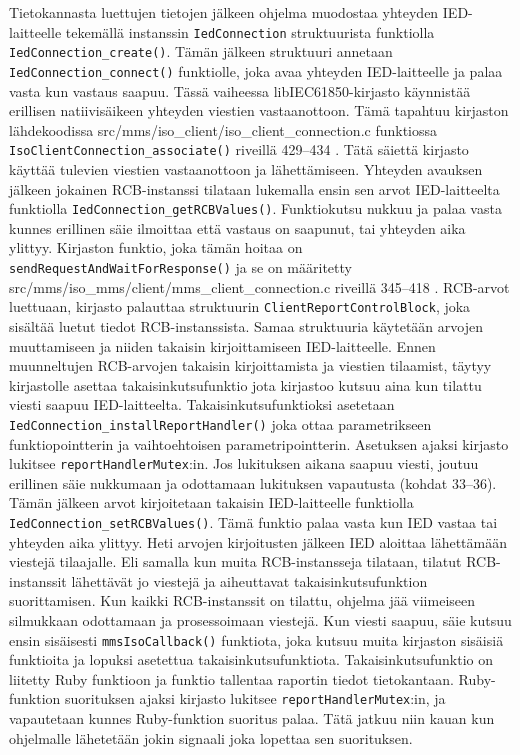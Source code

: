 Tietokannasta luettujen tietojen jälkeen ohjelma muodostaa yhteyden IED-laitteelle tekemällä instanssin \texttt{IedConnection} struktuurista funktiolla \texttt{IedConnection\_create()}. Tämän jälkeen struktuuri annetaan \texttt{IedConnection\_connect()} funktiolle, joka avaa yhteyden IED-laitteelle ja palaa vasta kun vastaus saapuu. Tässä vaiheessa libIEC61850-kirjasto käynnistää erillisen natiivisäikeen yhteyden viestien vastaanottoon. Tämä tapahtuu kirjaston lähdekoodissa src/mms/iso\_client/iso\_client\_connection.c funktiossa \texttt{IsoClientConnection\_associate()} riveillä 429--434 \cite{libIEC61850-repo}. Tätä säiettä kirjasto käyttää tulevien viestien vastaanottoon ja lähettämiseen. Yhteyden avauksen jälkeen jokainen RCB-instanssi tilataan lukemalla ensin sen arvot IED-laitteelta funktiolla \texttt{IedConnection\_getRCBValues()}. Funktiokutsu nukkuu ja palaa vasta kunnes erillinen säie ilmoittaa että vastaus on saapunut, tai yhteyden aika ylittyy. Kirjaston funktio, joka tämän hoitaa on \texttt{sendRequestAndWaitForResponse()} ja se on määritetty src/mms/iso\_mms/client/mms\_client\_connection.c riveillä 345--418 \cite{libIEC61850-repo}. RCB-arvot luettuaan, kirjasto palauttaa struktuurin \texttt{ClientReportControlBlock}, joka sisältää luetut tiedot RCB-instanssista. Samaa struktuuria käytetään arvojen muuttamiseen ja niiden takaisin kirjoittamiseen IED-laitteelle. Ennen muunneltujen RCB-arvojen takaisin kirjoittamista ja viestien tilaamist, täytyy kirjastolle asettaa takaisinkutsufunktio jota kirjastoo kutsuu aina kun tilattu viesti saapuu IED-laitteelta. Takaisinkutsufunktioksi asetetaan \texttt{IedConnection\_installReportHandler()} joka ottaa parametrikseen funktiopointterin ja vaihtoehtoisen parametripointterin. Asetuksen ajaksi kirjasto lukitsee \texttt{reportHandlerMutex}:in. Jos lukituksen aikana saapuu viesti, joutuu erillinen säie nukkumaan ja odottamaan lukituksen vapautusta (kohdat 33--36). Tämän jälkeen arvot kirjoitetaan takaisin IED-laitteelle funktiolla \texttt{IedConnection\_setRCBValues()}. Tämä funktio palaa vasta kun IED vastaa tai yhteyden aika ylittyy. Heti arvojen kirjoitusten jälkeen IED aloittaa lähettämään viestejä tilaajalle. Eli samalla kun muita RCB-instansseja tilataan, tilatut RCB-instanssit lähettävät jo viestejä ja aiheuttavat takaisinkutsufunktion suorittamisen. Kun kaikki RCB-instanssit on tilattu, ohjelma jää viimeiseen silmukkaan odottamaan ja prosessoimaan viestejä. Kun viesti saapuu, säie kutsuu ensin sisäisesti \texttt{mmsIsoCallback()} funktiota, joka kutsuu muita kirjaston sisäisiä funktioita ja lopuksi asetettua takaisinkutsufunktiota. Takaisinkutsufunktio on liitetty Ruby funktioon ja funktio tallentaa raportin tiedot tietokantaan. Ruby-funktion suorituksen ajaksi kirjasto lukitsee \texttt{reportHandlerMutex}:in, ja vapautetaan kunnes Ruby-funktion suoritus palaa. Tätä jatkuu niin kauan kun ohjelmalle lähetetään jokin signaali joka lopettaa sen suorituksen. \cite{Kozlovski2017, Storimer2013}

